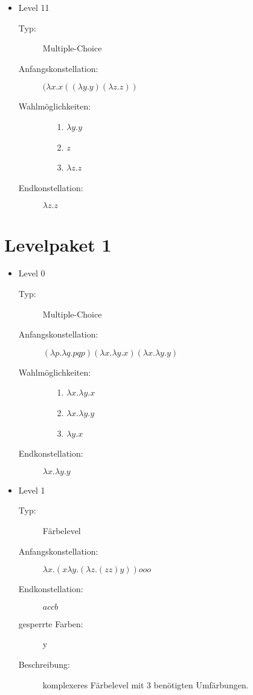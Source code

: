 \documentclass[parskip=full]{scrreprt}
\begin{document}
\begin{itemize}
	\item{Level 11} 
		\begin{description}
			\item[Typ:] Multiple-Choice 
			\item[Anfangskonstellation:] \((\lambda x . x ((\lambda y . y) (\lambda z . z ) ) \)    
			\item[Wahlmöglichkeiten:] \hfill
				\begin{itemize}
					\item[1.] \( \lambda y . y\) 
					\item[2.] \( z \) 
					\item[3.] \(\lambda z . z \)
				\end{itemize}
			\item[Endkonstellation:]\( \lambda z . z\)
		\end{description}


\end{itemize}
\chapter{Levelpaket 1}
\begin{itemize}

	\item{Level 0}
		\begin{description}
			\item[Typ:] Multiple-Choice 
			\item[Anfangskonstellation:] \((\lambda p .\lambda q . p q p ) (\lambda x . \lambda y . x ) (\lambda x . \lambda y . y )  \)    
			\item[Wahlmöglichkeiten:] \hfill
				\begin{itemize}
					\item[1.] \(\lambda x . \lambda y . x \) 
					\item[2.] \(\lambda x . \lambda y . y \)
					\item[3.] \(\lambda y . x \)
				\end{itemize}
			\item[Endkonstellation:]\(\lambda x . \lambda y . y \)
		\end{description}

	\item{Level 1}
		\begin{description} 
		\item[Typ:] Färbelevel 
		\item[Anfangskonstellation:] \(\lambda x . ( x \lambda y .  ( \lambda z . (z z) y )  )  o o o\)   
		\item[Endkonstellation:] \(a c c b\) 
		\item[gesperrte Farben:] y 
		\item[Beschreibung:] komplexeres Färbelevel mit 3 benötigten Umfärbungen. 

		\end{description}
	
\end{itemize}
\end{document}
